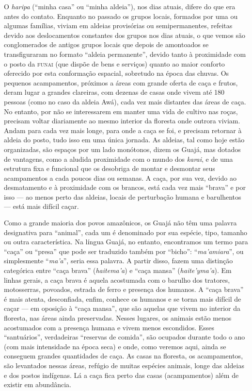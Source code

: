 O \emph{haripa} (``minha casa'' ou ``minha aldeia''), nos dias atuais,
difere do que era antes do contato. Enquanto no passado os grupos
locais, formados por uma ou algumas famílias, viviam em aldeias
provisórias ou semipermanentes, refeitas devido aos deslocamentos
constantes dos grupos nos dias atuais, o que vemos são conglomerados de
antigos grupos locais que depois de amontoados se transfiguraram no
formato ``aldeia permanente'', devido tanto à proximidade com o posto da
\textsc{funai} (que dispõe de bens e serviços) quanto ao maior conforto oferecido
por esta conformação espacial, sobretudo na época das chuvas. Os
pequenos acampamentos, próximos a áreas com grande oferta de caça e
frutos, deram lugar a grandes clareiras, com dezenas de casas onde vivem
até 180 pessoas (como no caso da aldeia Awá), cada vez mais
distantes das áreas de caça. No entanto, por não se interessarem em
manter uma vida de cultivo nas roças, precisam voltar diariamente ao
mesmo interior da floresta onde outrora viviam. Andam para cada vez mais
longe, para onde a caça se foi, e precisam retornar à aldeia do posto,
tudo isso em uma única jornada. As aldeias, tal como hoje estão
organizadas, são espaços por um lado monótonos, dizem os Guajá, mas
dotados de vantagens, como a aludida proximidade com o mundo dos
\emph{karai}, e de uma estrutura fixa e funcional que os desobriga de
montar e desmontar seus acampamentos a cada poucos dias ou semanas. A
caça, por sua vez, devido ao desmatamento e à proximidade com os
brancos, está cada vez mais ``brava'' e por isso --- ao menos perto das
aldeias, locais de perturbação humana e barulhentos --- está mais difícil
caçar.

Como a grande maioria dos povos amazônicos, os Guajá não têm uma palavra
designativa para ``animal'', cada um é denominado por sua espécie, tipo,
tamanho ou outra característica. Na língua Guajá, no entanto,
encontramos um termo para ``caça'' ou ``presa'' que pode ser traduzido
também por ``bicho'': ``\emph{ma'amiara}'', ou simplesmente
``\emph{ma'a}'', seria essa palavra. A partir disso, fazem uma distinção
categórica entre ``caça brava'' (\emph{haitema'a}) e ``caça mansa''
(\emph{haite'yma'a}). Em linhas gerais, a caça brava é aquela acostumada
com o barulho dos tratores, motosserras, povoados, estrada de ferro e
presença dos humanos. A ``caça brava'' é mais atenta, desconfiada, enfim,
conhece os humanos e se torna mais difícil de caçar --- em oposição à
``caça mansa'', que são aquelas que vivem no interior da floresta, nas
áreas ainda preservadas. Nesses lugares, os animais estão menos
acostumados com a presença humana e vivem menos escondidos. Esses
``santuários'', verdadeiras ``reservas de comida'', são ocupados durante
todo o ano (com mais intensidade na época seca) e onde, como veremos
aqui, ainda se conseguem grandes quantidades de caça. As casas na
floresta, os acampamentos, são levantados nessas áreas, refúgio de
muitas espécies animais, longe das aldeias e dos postos indígenas. Lá a
caça fica perto das casas (acampamentos) além de existir em abundância.

